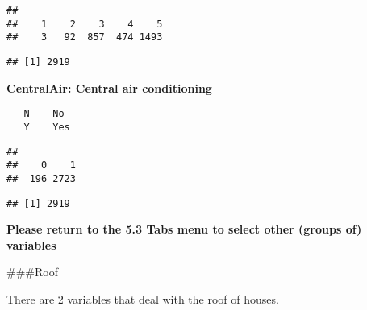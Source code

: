 \documentclass[]{article}
\newenvironment{Shaded}{\begin{snugshade}}{\end{snugshade}}
\newcommand{\DecValTok}[1]{\textcolor[rgb]{0.00,0.00,0.81}{#1}}
\newcommand{\KeywordTok}[1]{\textcolor[rgb]{0.13,0.29,0.53}{\textbf{#1}}}
\newcommand{\NormalTok}[1]{#1}
\newcommand{\OperatorTok}[1]{\textcolor[rgb]{0.81,0.36,0.00}{\textbf{#1}}}
\newcommand{\StringTok}[1]{\textcolor[rgb]{0.31,0.60,0.02}{#1}}
\begin{document}
\begin{verbatim}
## 
##    1    2    3    4    5 
##    3   92  857  474 1493
\end{verbatim}

\begin{Shaded}
\end{Shaded}

\begin{verbatim}
## [1] 2919
\end{verbatim}

\textbf{CentralAir: Central air conditioning}

\begin{verbatim}
   N    No
   Y    Yes
\end{verbatim}

\begin{Shaded}
\end{Shaded}

\begin{verbatim}
## 
##    0    1 
##  196 2723
\end{verbatim}

\begin{Shaded}
\end{Shaded}

\begin{verbatim}
## [1] 2919
\end{verbatim}

\textbf{Please return to the 5.3 Tabs menu to select other (groups of)
variables}

\#\#\#Roof

There are 2 variables that deal with the roof of houses.
\end{document}
